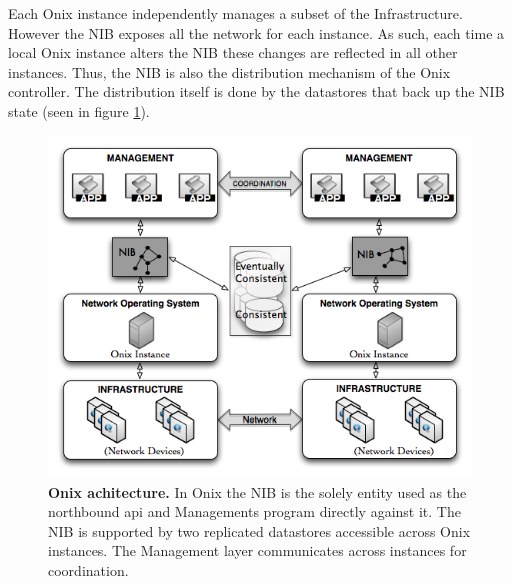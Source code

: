 \documentclass[12pt,openright,twoside]{report}
\begin{document}
\begin{itemize}
Each Onix instance  independently manages a subset of the
Infrastructure. However the NIB  exposes all the network for each
instance. As such, each time a local Onix instance alters the NIB these
changes are reflected in all other instances. Thus, the NIB is also
the distribution mechanism of the Onix controller. The  distribution
itself is done by the datastores that back up  the NIB state (seen
in figure \ref{fig:onix-design}).

\begin{figure}
  \centering 
  \includegraphics[scale=0.5]{pic/onix-design.png}
  \caption[Onix architecture] {\textbf{Onix achitecture.} In Onix the NIB is the
    solely entity used as the northbound api and Managements program
    directly against it. The NIB is supported by
    two replicated datastores accessible across Onix instances.  The
    Management layer communicates across instances for coordination.}
  \label{fig:onix-design}
\end{figure}


\end{itemize}
\end{document}
